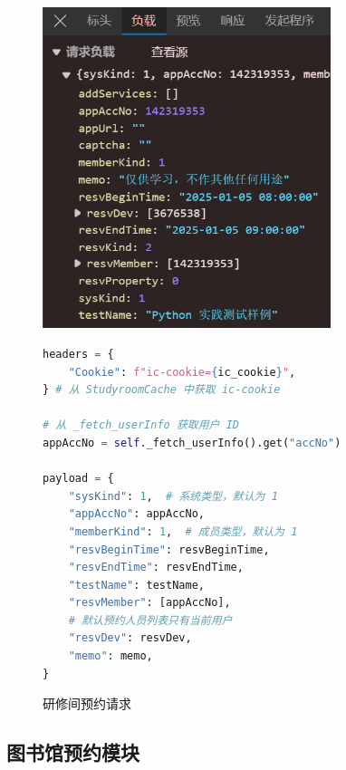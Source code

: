 \documentclass[14pt,a4paper,UTF8,twoside]{article}
\begin{document}
\begin{figure}[H]
    \centering
    \begin{minipage}[H]{0.45\textwidth} %
        \centering
        \includegraphics[width=0.75\textwidth]{img/studyroom_request.png}
        \caption{研修间预约请求}
        \label{fig:studyroom_request}
    \end{minipage}
    \hspace{0.05\textwidth} %
    \begin{minipage}[H]{0.45\textwidth} %
        \centering
        \begin{lstlisting}[language=python, caption={预约请求需要传入的字段}]
headers = {
    "Cookie": f"ic-cookie={ic_cookie}", 
} # 从 StudyroomCache 中获取 ic-cookie

# 从 _fetch_userInfo 获取用户 ID
appAccNo = self._fetch_userInfo().get("accNo")

payload = {
    "sysKind": 1,  # 系统类型，默认为 1
    "appAccNo": appAccNo,
    "memberKind": 1,  # 成员类型，默认为 1
    "resvBeginTime": resvBeginTime,
    "resvEndTime": resvEndTime,
    "testName": testName,
    "resvMember": [appAccNo],
    # 默认预约人员列表只有当前用户
    "resvDev": resvDev,
    "memo": memo,
}
        \end{lstlisting}
    \end{minipage}
\end{figure}

\subsection{图书馆预约模块}
\end{document}
